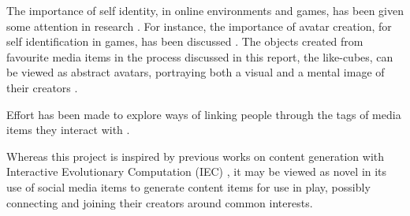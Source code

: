 \documentclass[]{article}
\begin{document}

The importance of self identity, in online environments and games, has been given some attention in research \cite{jones1997virtual,zhao2008identity,slater2002social,kollock2002communities,marwick2005selling,vitak2008facebook}.  For instance, the importance of avatar creation, for self identification in games, has been discussed \cite{waggoner2009my,trepte2010avatar}.  The objects created from favourite media items in the process discussed in this report, the like-cubes, can be viewed as abstract avatars, portraying both a visual and a mental image of their creators \cite{trepte2010avatar}.


 Effort has been made to explore ways of linking people through the tags of media items they interact with \cite{guy2010social,hung2008tag}.  

Whereas this project is inspired by previous works on content generation with Interactive Evolutionary Computation (IEC) \cite{cardamone2011interactive,togelius2007towards,secretan2011picbreeder}, it may be viewed as novel in its use of social media items to generate content items for use in play, possibly connecting and joining their creators around common interests.
\end{document}
